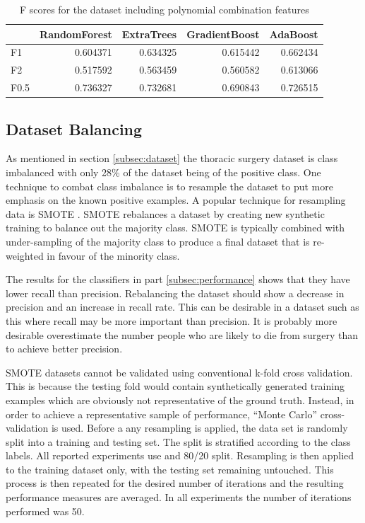 \documentclass[journal]{IEEEtran}
\begin{document}
\begin{table}
\caption{F scores for the dataset including polynomial combination features}
\begin{tabular}{lrrrr}
{} &  RandomForest &  ExtraTrees &  GradientBoost &  AdaBoost \\
\hline
F1   &      0.604371 &    0.634325 &       0.615442 &  0.662434 \\
F2   &      0.517592 &    0.563459 &       0.560582 &  0.613066 \\
F0.5 &      0.736327 &    0.732681 &       0.690843 &  0.726515 \\
\end{tabular}

\label{table:f-scores-poly}	
\end{table}

\subsection{Dataset Balancing}
\label{subsec:dataset-balancing}
As mentioned in section \ref{subsec:dataset} the thoracic surgery dataset is class imbalanced with only 28\% of the dataset being of the positive class. One technique to combat class imbalance is to resample the dataset to put more emphasis on the known positive examples. A popular technique for resampling data is SMOTE \cite{chawla2002smote}. SMOTE rebalances a dataset by creating new synthetic training to balance out the majority class. SMOTE is typically combined with under-sampling of the majority class to produce a final dataset that is re-weighted in favour of the minority class. 

The results for the classifiers in part \ref{subsec:performance} shows that they have lower recall than precision. Rebalancing the dataset should show a decrease in precision and an increase in recall rate. This can be desirable in a dataset such as this where recall may be more important than precision. It is probably more desirable overestimate the number people who are likely to die from surgery than to achieve better precision.

SMOTE datasets cannot be validated using conventional k-fold cross validation. This is because the testing fold would contain synthetically generated training examples which are obviously not representative of the ground truth. Instead, in order to achieve a representative sample of performance, ``Monte Carlo'' cross-validation \cite{dubitzky2007fundamentals} is used. Before a any resampling is applied, the data set is randomly split into a training and testing set. The split is stratified according to the class labels. All reported experiments use and 80/20 split. Resampling is then applied to the training dataset only, with the testing set remaining untouched. This process is then repeated for the desired number of iterations and the resulting performance measures are averaged. In all experiments the number of iterations performed was 50.  
\end{document}
